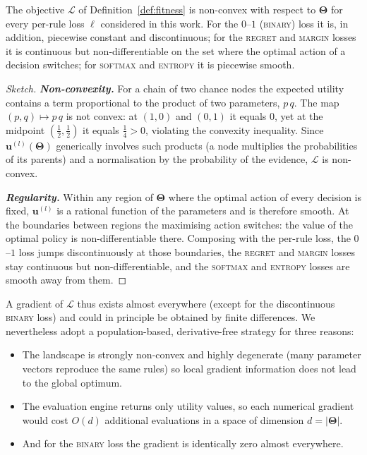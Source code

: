 \begin{proposition}
\label{prop:nonsmooth}
The objective $\mathcal{L}$ of Definition~\ref{def:fitness} is
non-convex with respect to $\boldsymbol{\Theta}$ for every per-rule
loss $\ell$ considered in this work. For the $0$--$1$ (\textsc{binary})
loss it is, in addition, piecewise constant and discontinuous; for the
\textsc{regret} and \textsc{margin} losses it is continuous but
non-differentiable on the set where the optimal action of a decision
switches; for \textsc{softmax} and \textsc{entropy} it is piecewise
smooth.
\end{proposition}

\begin{proof}[Sketch]
\textbf{\emph{Non-convexity.}} For a chain of two chance nodes the expected
utility contains a term proportional to the product of two parameters,
$p\,q$. The map $(p,q)\mapsto p\,q$ is not convex: at $(1,0)$ and
$(0,1)$ it equals $0$, yet at the midpoint $(\tfrac12,\tfrac12)$ it
equals $\tfrac14>0$, violating the convexity inequality. Since
$\mathbf{u}^{(l)}(\boldsymbol{\Theta})$ generically involves such
products (a node multiplies the probabilities of its parents) and a
normalisation by the probability of the evidence, $\mathcal{L}$ is
non-convex.

\textbf{\emph{Regularity.}} Within any region of $\boldsymbol{\Theta}$ where the
optimal action of every decision is fixed, $\mathbf{u}^{(l)}$ is a
rational function of the parameters and is therefore smooth. At the
boundaries between regions the maximising action switches: the value of the optimal policy is non-differentiable there. Composing with the per-rule loss,
the $0$--$1$ loss jumps discontinuously at those boundaries, the
\textsc{regret} and \textsc{margin} losses stay continuous but
non-differentiable, and the \textsc{softmax} and \textsc{entropy} losses
are smooth away from them.
\end{proof}

\noindent A gradient of $\mathcal{L}$ thus exists almost everywhere
(except for the discontinuous \textsc{binary} loss) and could in
principle be obtained by finite differences. We nevertheless adopt a
population-based, derivative-free strategy for three reasons: 

\begin{itemize}
    \item The landscape is strongly non-convex and highly degenerate (many parameter vectors reproduce the same rules) so local gradient information does not
lead to the global optimum.
    \item The evaluation engine returns only utility
values, so each numerical gradient would cost $O(d)$ additional
evaluations in a space of dimension $d=|\boldsymbol{\Theta}|$.
    \item And for the
\textsc{binary} loss the gradient is identically zero almost everywhere.
\end{itemize}


